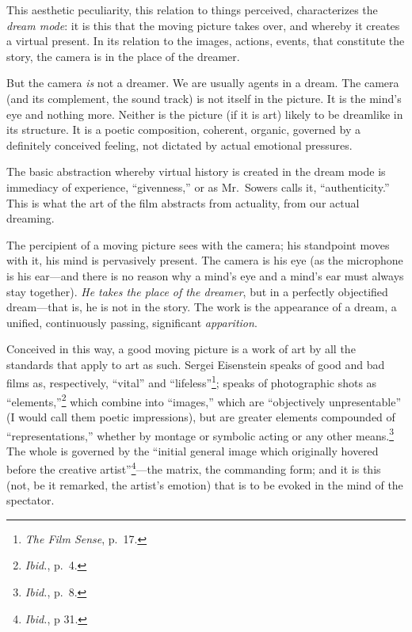\documentclass{tufte-handout}
\begin{document}
This aesthetic peculiarity, this relation to things perceived,
char­acterizes the \emph{dream mode}: it is this that the moving picture
takes over, and whereby it creates a virtual present. In its relation to
the images, actions, events, that constitute the story, the camera is in
the place of the dreamer.

But the camera \emph{is} not a dreamer. We are usually agents in a
dream. The camera (and its complement, the sound track) is not itself in
the picture. It is the mind's eye and nothing more. Neither is the
picture (if it is art) likely to be dreamlike in its structure. It is a
poetic com­position, coherent, organic, governed by a definitely
conceived feeling, not dictated by actual emotional pressures.

The basic abstraction whereby virtual history is created in the dream
mode is immediacy of experience, ``givenness,'' or as Mr.~Sowers calls
it, ``authenticity.'' This is what the art of the film abstracts from
actu­ality, from our actual dreaming.

The percipient of a moving picture sees with the camera; his stand­point
moves with it, his mind is pervasively present. The camera is his eye
(as the microphone is his ear---and there is no reason why a mind's eye
and a mind's ear must always stay together). \emph{He takes the place of
the dreamer}, but in a perfectly objectified dream---that is, he is not
in the story. The work is the appearance of a dream, a unified,
continu­ously passing, significant \emph{apparition}.

Conceived in this way, a good moving picture is a work of art by all the
standards that apply to art as such. Sergei Eisenstein speaks of good
and bad films as, respectively, ``vital'' and ``lifeless''\footnote{\emph{The
  Film Sense}, p.~17.}; speaks of photographic shots as
``elements,''\footnote{\emph{Ibid.}, p.~4.} which combine into
``images,'' which are ``objectively unpresentable'' (I would call them
poetic impressions), but are greater elements compounded of
``representations,'' whether by mon­tage or symbolic acting or any other
means.\footnote{\emph{Ibid.}, p.~8.} The whole is governed by the
``initial general image which originally hovered before the creative
artist''\footnote{\emph{Ibid.}, p 31.}---the matrix, the commanding
form; and it is this (not, be it remarked, the artist's emotion) that is
to be evoked in the mind of the spectator.
\end{document}
